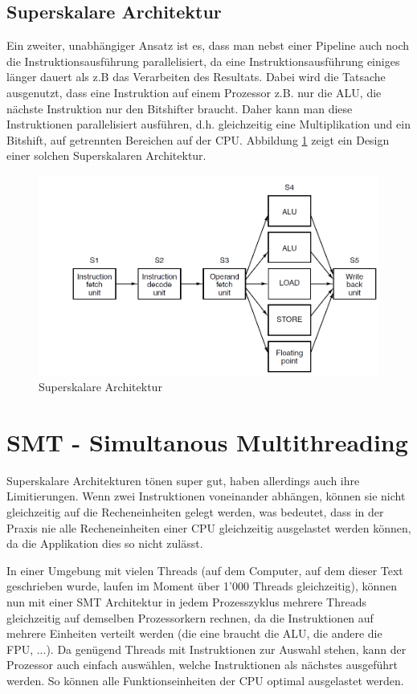 \subsection{Superskalare Architektur}
Ein zweiter, unabhängiger Ansatz ist es, dass man nebst einer Pipeline auch noch die Instruktionsausführung parallelisiert, da eine Instruktionsausführung einiges länger dauert als z.B das Verarbeiten des Resultats. Dabei wird die Tatsache ausgenutzt, dass eine Instruktion auf einem Prozessor z.B. nur die ALU, die nächste Instruktion nur den Bitshifter braucht. Daher kann man diese Instruktionen parallelisiert ausführen, d.h. gleichzeitig eine Multiplikation und ein Bitshift, auf getrennten Bereichen auf der CPU. Abbildung \ref{fig:superskalar} zeigt ein Design einer solchen Superskalaren Architektur.
\begin{figure}
\centering
\includegraphics[width=0.7\linewidth]{fig/superskalar}
\caption{Superskalare Architektur}
\label{fig:superskalar}
\end{figure}

\section{SMT - Simultanous Multithreading}
Superskalare Architekturen tönen super gut, haben allerdings auch ihre Limitierungen. Wenn zwei Instruktionen voneinander abhängen, können sie nicht gleichzeitig auf die Recheneinheiten gelegt werden, was bedeutet, dass in der Praxis nie alle Recheneinheiten einer CPU gleichzeitig ausgelastet werden können, da die Applikation dies so nicht zulässt.

In einer Umgebung mit vielen Threads (auf dem Computer, auf dem dieser Text geschrieben wurde, laufen im Moment über 1'000 Threads gleichzeitig), können nun mit einer SMT Architektur in jedem Prozesszyklus mehrere Threads gleichzeitig auf demselben Prozessorkern rechnen, da die Instruktionen auf mehrere Einheiten verteilt werden (die eine braucht die ALU, die andere die FPU, ...). Da genügend Threads mit Instruktionen zur Auswahl stehen, kann der Prozessor auch einfach auswählen, welche Instruktionen als nächstes ausgeführt werden. So können alle Funktionseinheiten der CPU optimal ausgelastet werden.

